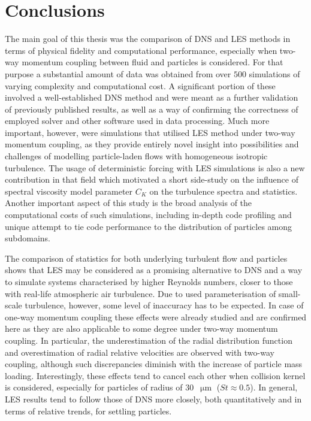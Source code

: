 \documentclass{pracamgren}
\begin{document}
\chapter*{Conclusions}
\label{ch:end}

The main goal of this thesis was the comparison of DNS and LES methods in terms of physical fidelity and computational performance, especially when two-way momentum coupling between fluid and particles is considered.
For that purpose a substantial amount of data was obtained from over $500$ simulations of varying complexity and computational cost.
A significant portion of these involved a well-established DNS method and were meant as a further validation of previously published results, as well as a way of confirming the correctness of employed solver and other software used in data processing.
Much more important, however, were simulations that utilised LES method under two-way momentum coupling, as they provide entirely novel insight into possibilities and challenges of modelling particle-laden flows with homogeneous isotropic turbulence.
The usage of deterministic forcing with LES simulations is also a new contribution in that field which motivated a short side-study on the influence of spectral viscosity model parameter $C_K$ on the turbulence spectra and statistics.
Another important aspect of this study is the broad analysis of the computational costs of such simulations, including in-depth code profiling and unique attempt to tie code performance to the distribution of particles among subdomains.

The comparison of statistics for both underlying turbulent flow and particles  shows that LES may be considered as a promising alternative to DNS and a way to simulate systems characterised by higher Reynolds numbers, closer to those with real-life atmospheric air turbulence.
Due to used parameterisation of small-scale turbulence, however, some level of inaccuracy has to be expected.
In case of one-way momentum coupling these effects were already studied and are confirmed here as they are also applicable to some degree under two-way momentum coupling.
In particular, the underestimation of the radial distribution function and overestimation of radial relative velocities are observed with two-way coupling, although such discrepancies diminish with the increase of particle mass loading.
Interestingly, these effects tend to cancel each other when collision kernel is considered, especially for particles of radius of $30$~$\upmu\text{m}$ ($St \approx 0.5$).
In general, LES results tend to follow those of DNS more closely, both quantitatively and in terms of relative trends, for settling particles.
\end{document}
